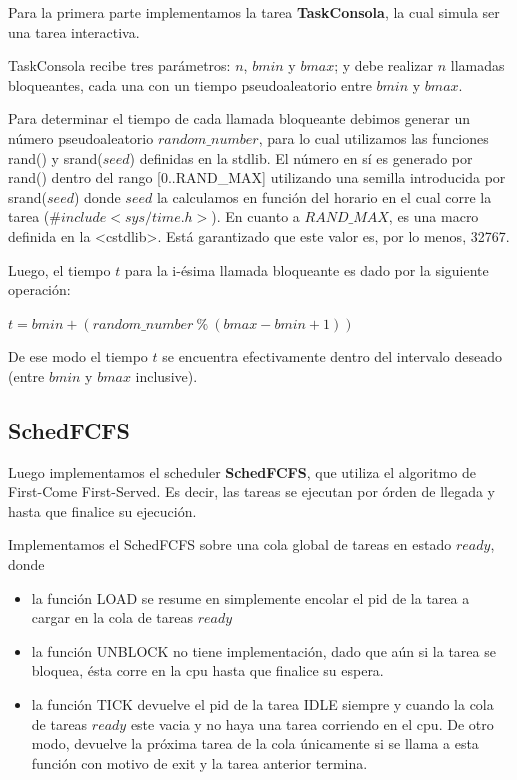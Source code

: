 Para la primera parte implementamos la tarea \textbf{TaskConsola}, la cual simula ser una tarea interactiva.

TaskConsola recibe tres parámetros: $n$, $bmin$ y $bmax$; y debe realizar $n$ llamadas bloqueantes, cada una con un tiempo pseudoaleatorio entre $bmin$ y $bmax$. 

Para determinar el tiempo de cada llamada bloqueante debimos generar un número pseudoaleatorio $random\_number$, para lo cual utilizamos las funciones rand() y srand($seed$) definidas en la stdlib. El número en sí es generado por rand() dentro del rango [0..RAND\_MAX] utilizando una semilla introducida por srand($seed$) donde $seed$ la calculamos en función del horario en el cual corre la tarea ($\#include <sys/time.h>$). 
En cuanto a $RAND\_MAX$, es una macro definida en la <cstdlib>. Está garantizado que este valor es, por lo menos, 32767.

Luego, el tiempo $t$ para la i-ésima llamada bloqueante es dado por la siguiente operación:

\begin{center}
	$t = bmin + (random\_number \ \% \ (bmax-bmin+1))$
\end{center}

%

De ese modo el tiempo $t$ se encuentra efectivamente dentro del intervalo deseado (entre $bmin$ y $bmax$ inclusive).

\subsection{SchedFCFS}

Luego implementamos el scheduler \textbf{SchedFCFS}, que utiliza el algoritmo de First-Come First-Served. Es decir, las tareas se ejecutan por órden de llegada y hasta que finalice su ejecución. 

Implementamos el SchedFCFS sobre una cola global de tareas en estado $ready$, donde 

\begin{itemize}
	\item la función LOAD se resume en simplemente encolar el pid de la tarea a cargar en la cola de tareas $ready$ 
	\item la función UNBLOCK no tiene implementación, dado que aún si la tarea se bloquea, ésta corre en la cpu hasta que finalice su espera.
	\item la función TICK devuelve el pid de la tarea IDLE siempre y cuando la cola de tareas $ready$ este vacia y no haya una tarea corriendo en el cpu. De otro modo, devuelve la próxima tarea de la cola únicamente si se llama a esta función con motivo de exit y la tarea anterior termina.
\end{itemize}

